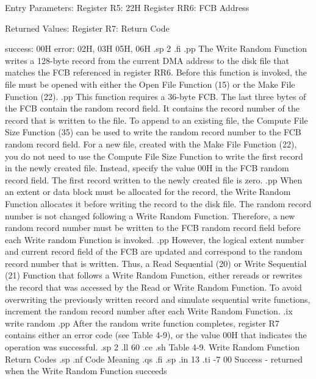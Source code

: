               Entry Parameters:
                 Register   R5:  22H
                 Register  RR6:  FCB Address

              Returned  Values:
                 Register   R7:  Return Code

                                 success:  00H
                                   error:  02H, 03H
                                           05H, 06H
.sp 2
.fi
.pp
The Write Random Function writes a 128-byte record from the
current DMA address to the disk file that matches the 
FCB referenced in register  RR6.  Before this function is invoked,
the file must be opened with either the Open File Function (15)
or the Make File Function (22).
.pp
This function requires a 36-byte FCB. The last three bytes of the
FCB contain the random record field. It contains the record number of
the record that is written to the file. To append to an existing file, the
Compute File Size Function (35) can be used to write the random
record number to the FCB random record field. For a new file,
created with the Make File Function (22), you do not need to use
the Compute File Size Function to write the first record in the 
newly created file.  Instead, specify the value 00H
in the FCB random record field. The first record written
to the newly created file is zero. 
.pp
When an extent or data block must be allocated for the record, the
Write Random Function allocates it before writing the record to
the disk file. The random record number is not changed following a
Write Random Function. Therefore, a new random record number must 
be written to the FCB random record field before each Write random 
Function is invoked.
.pp
However, the logical extent number and current record field of
the FCB are updated and correspond to the random record number
that is written. Thus, a Read Sequential (20) or Write Sequential 
(21) Function that 
follows a Write Random Function, either rereads or rewrites the
record that was accessed by the Read or Write Random Function. To avoid
overwriting the previously written record and simulate sequential
write functions, increment the 
random record number after each Write Random Function. 
.ix write random
.pp
After the random write function completes, register   R7 contains
either an error code (see Table 4-9), or the value 00H that
indicates the operation was successful. 
.sp 2
.ll 60
.ce
.sh
Table 4-9.  Write Random Function Return Codes
.sp
.nf
     Code                         Meaning
.qs
.fi
.sp     
.in 13
.ti -7
00     Success - returned when the Write Random Function succeeds 
